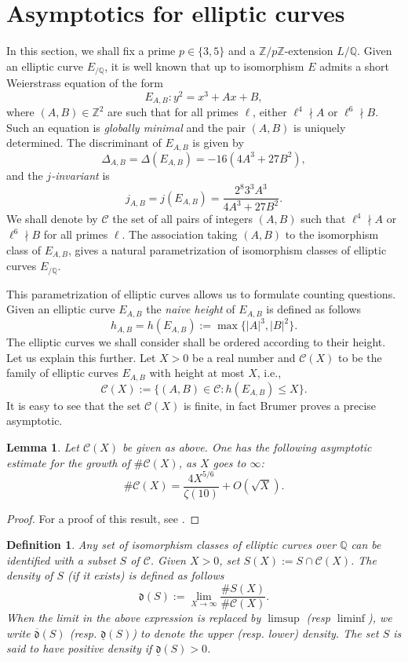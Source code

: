 \documentclass[12pt]{amsart}
\newtheorem{lemma}[theorem]{Lemma}
\newtheorem{definition}[theorem]{Definition}
\newcommand{\Z}{\mathbb{Z}}
\newcommand{\Q}{\mathbb{Q}}
\newcommand{\cC}{\mathcal{C}}
\newcommand{\op}[1]{\operatorname{#1}}
\numberwithin{equation}{section}
\begin{document}
\section{Asymptotics for elliptic curves}\label{s 3}
\par In this section, we shall fix a prime $p\in\{3, 5\}$ and a $\Z/p\Z$-extension $L/\Q$. Given an elliptic curve $E_{/\Q}$, it is well known that up to isomorphism $E$ admits a short Weierstrass equation of the form \[E_{A,B}:y^2=x^3+Ax+B,\] where $(A, B)\in \Z^2$ are such that for all primes $\ell$, either $\ell^4 \nmid A$ or $\ell^6 \nmid B$. Such an equation is \emph{globally minimal} and the pair $(A,B)$ is uniquely determined. The discriminant of $E_{A,B}$ is given by 
\[\Delta_{A,B}=\Delta(E_{A,B})=-16(4A^3+27B^2),\] and the \emph{$j$-invariant} is \[j_{A,B}=j(E_{A,B})=\frac{2^{8}3^3 A^3}{4A^3+27B^2}.\]
We shall denote by $\cC$ the set of all pairs of integers $(A, B)$ such that $\ell^4\nmid A$ or $\ell^6\nmid B$ for all primes $\ell$. The association taking $(A,B)$ to the isomorphism class of $E_{A,B}$, gives a natural parametrization of isomorphism classes of elliptic curves $E_{/\Q}$.
\par This parametrization of elliptic curves allows us to formulate counting questions. Given an elliptic curve $E_{A,B}$ the \emph{naive height} of $E_{A,B}$ is defined as follows \[h_{A,B}=h\left(E_{A,B}\right):=\op{max} \{|A|^3, |B|^2\}.\] The elliptic curves we shall consider shall be ordered according to their height. Let us explain this further. Let $X>0$ be a real number and $\cC(X)$ to be the family of elliptic curves $E_{A,B}$ with height at most $X$, i.e.,
\[\cC(X):=\{(A,B)\in \cC: h\left(E_{A,B}\right) \le X\}.\] It is easy to see that the set $\cC(X)$ is finite, in fact Brumer proves a precise asymptotic. 

\begin{lemma}\label{brumer lemma}
Let $\cC(X)$ be given as above. One has the following asymptotic estimate for the growth of $\#\cC(X)$, as $X$ goes to $\infty$:
\[
\# \cC(X) = \frac{4X^{5/6}}{\zeta(10)} + O\left(\sqrt{X}\right).
\]
\end{lemma}
\begin{proof}
    For a proof of this result, see \cite[Lemma 4.3]{Bru92}.
\end{proof}


\begin{definition}
    Any set of isomorphism classes of elliptic curves over $\Q$ can be identified with a subset $S$ of $\cC$. Given $X>0$, set $S(X):=S\cap \cC(X)$. The density of $S$ (if it exists) is defined as follows
    \begin{equation}\label{limit def density}\mathfrak{d}(S):=\lim_{X\rightarrow \infty} \frac{\# S(X)}{\#\cC(X)}.\end{equation}
    When the limit in the above expression is replaced by $\limsup$ (resp $\liminf$), we write $\overline{\mathfrak{d}}(S)$ (resp. $\underline{\mathfrak{d}}(S)$) to denote the upper (resp. lower) density. The set $S$ is said to have \emph{positive density} if $\underline{\mathfrak{d}}(S)>0$.
\end{definition}
\end{document}

